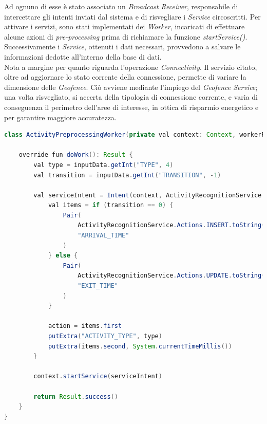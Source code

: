 \documentclass{article}
\begin{document}
    Ad ognuno di esse è stato associato un \textit{Broadcast Receiver}, responsabile di intercettare gli intenti inviati dal sistema e di risvegliare i \textit{Service} circoscritti. Per attivare i servizi, sono stati implementati dei \textit{Worker}, incaricati di effettuare alcune azioni di \textit{pre-processing} prima di richiamare la funzione \textit{startService()}. Successivamente i \textit{Service}, ottenuti i dati necessari, provvedono a salvare le informazioni dedotte all'interno della base di dati. \vspace{7pt}\\
    Nota a margine per quanto riguarda l'operazione \textit{Connectivity}. Il servizio citato, oltre ad aggiornare lo stato corrente della connessione, permette di variare la dimensione delle \textit{Geofence}. Ciò avviene mediante l'impiego del \textit{Geofence Service};
    una volta risvegliato, si accerta della tipologia di connessione corrente, e varia di conseguenza il perimetro dell'aree di interesse,
    in ottica di risparmio energetico e per garantire maggiore accuratezza.
    \begin{lstlisting}[language=Java]
class ActivityPreprocessingWorker(private val context: Context, workerParams: WorkerParameters): Worker(context, workerParams) {

    override fun doWork(): Result {
        val type = inputData.getInt("TYPE", 4)
        val transition = inputData.getInt("TRANSITION", -1)

        val serviceIntent = Intent(context, ActivityRecognitionService::class.java).apply {
            val items = if (transition == 0) {
                Pair(
                    ActivityRecognitionService.Actions.INSERT.toString(),
                    "ARRIVAL_TIME"
                )
            } else {
                Pair(
                    ActivityRecognitionService.Actions.UPDATE.toString(),
                    "EXIT_TIME"
                )
            }

            action = items.first
            putExtra("ACTIVITY_TYPE", type)
            putExtra(items.second, System.currentTimeMillis())
        }

        context.startService(serviceIntent)

        return Result.success()
    }
}
    \end{lstlisting}
\end{document}
